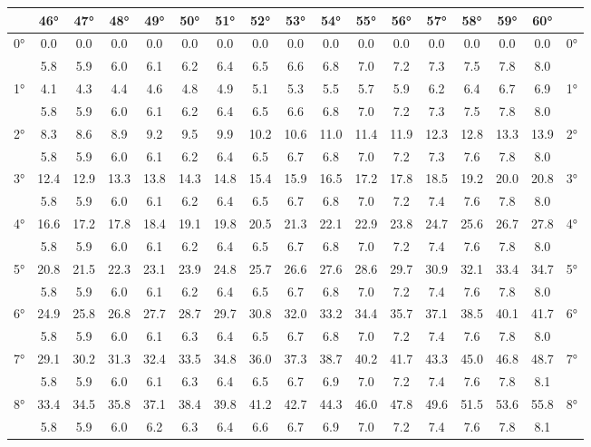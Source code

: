 \begin{scriptsize}\begin{tabular}{c || c | c | c | c | c | c | c | c | c | c | c | c | c | c | c || c}
		\space &46°&47°&48°&49°&50°&51°&52°&53°&54°&55°&56°&57°&58°&59°&60°\\\hline\hline
		\multirow{2}{*}{0°}&0.0&0.0&0.0&0.0&0.0&0.0&0.0&0.0&0.0&0.0&0.0&0.0&0.0&0.0&0.0&\multirow{2}{*}{0°}\\ \space&5.8&5.9&6.0&6.1&6.2&6.4&6.5&6.6&6.8&7.0&7.2&7.3&7.5&7.8&8.0&\space\\\hline
		\multirow{2}{*}{1°}&4.1&4.3&4.4&4.6&4.8&4.9&5.1&5.3&5.5&5.7&5.9&6.2&6.4&6.7&6.9&\multirow{2}{*}{1°}\\ \space&5.8&5.9&6.0&6.1&6.2&6.4&6.5&6.6&6.8&7.0&7.2&7.3&7.5&7.8&8.0&\space\\\hline
		\multirow{2}{*}{2°}&8.3&8.6&8.9&9.2&9.5&9.9&10.2&10.6&11.0&11.4&11.9&12.3&12.8&13.3&13.9&\multirow{2}{*}{2°}\\ \space&5.8&5.9&6.0&6.1&6.2&6.4&6.5&6.7&6.8&7.0&7.2&7.3&7.6&7.8&8.0&\space\\\hline
		\multirow{2}{*}{3°}&12.4&12.9&13.3&13.8&14.3&14.8&15.4&15.9&16.5&17.2&17.8&18.5&19.2&20.0&20.8&\multirow{2}{*}{3°}\\ \space&5.8&5.9&6.0&6.1&6.2&6.4&6.5&6.7&6.8&7.0&7.2&7.4&7.6&7.8&8.0&\space\\\hline
		\multirow{2}{*}{4°}&16.6&17.2&17.8&18.4&19.1&19.8&20.5&21.3&22.1&22.9&23.8&24.7&25.6&26.7&27.8&\multirow{2}{*}{4°}\\ \space&5.8&5.9&6.0&6.1&6.2&6.4&6.5&6.7&6.8&7.0&7.2&7.4&7.6&7.8&8.0&\space\\\hline
		\multirow{2}{*}{5°}&20.8&21.5&22.3&23.1&23.9&24.8&25.7&26.6&27.6&28.6&29.7&30.9&32.1&33.4&34.7&\multirow{2}{*}{5°}\\ \space&5.8&5.9&6.0&6.1&6.2&6.4&6.5&6.7&6.8&7.0&7.2&7.4&7.6&7.8&8.0&\space\\\hline
		\multirow{2}{*}{6°}&24.9&25.8&26.8&27.7&28.7&29.7&30.8&32.0&33.2&34.4&35.7&37.1&38.5&40.1&41.7&\multirow{2}{*}{6°}\\ \space&5.8&5.9&6.0&6.1&6.3&6.4&6.5&6.7&6.8&7.0&7.2&7.4&7.6&7.8&8.0&\space\\\hline
		\multirow{2}{*}{7°}&29.1&30.2&31.3&32.4&33.5&34.8&36.0&37.3&38.7&40.2&41.7&43.3&45.0&46.8&48.7&\multirow{2}{*}{7°}\\ \space&5.8&5.9&6.0&6.1&6.3&6.4&6.5&6.7&6.9&7.0&7.2&7.4&7.6&7.8&8.1&\space\\\hline
		\multirow{2}{*}{8°}&33.4&34.5&35.8&37.1&38.4&39.8&41.2&42.7&44.3&46.0&47.8&49.6&51.5&53.6&55.8&\multirow{2}{*}{8°}\\ \space&5.8&5.9&6.0&6.2&6.3&6.4&6.6&6.7&6.9&7.0&7.2&7.4&7.6&7.8&8.1&\space\\\hline

\end{tabular}
\end{scriptsize}
